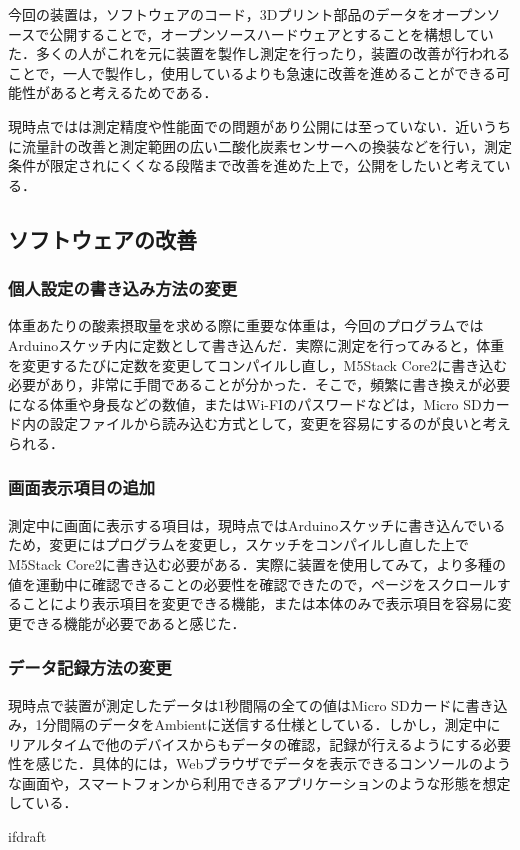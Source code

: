 今回の装置は，ソフトウェアのコード，3Dプリント部品のデータをオープンソースで公開することで，オープンソースハードウェアとすることを構想していた．多くの人がこれを元に装置を製作し測定を行ったり，装置の改善が行われることで，一人で製作し，使用しているよりも急速に改善を進めることができる可能性があると考えるためである．

現時点ではは測定精度や性能面での問題があり公開には至っていない．近いうちに流量計の改善と測定範囲の広い二酸化炭素センサーへの換装などを行い，測定条件が限定されにくくなる段階まで改善を進めた上で，公開をしたいと考えている．

\subsection{ソフトウェアの改善}

\subsubsection{個人設定の書き込み方法の変更}

体重あたりの酸素摂取量を求める際に重要な体重は，今回のプログラムではArduinoスケッチ内に定数として書き込んだ．実際に測定を行ってみると，体重を変更するたびに定数を変更してコンパイルし直し，M5Stack Core2に書き込む必要があり，非常に手間であることが分かった．そこで，頻繁に書き換えが必要になる体重や身長などの数値，またはWi-FIのパスワードなどは，Micro SDカード内の設定ファイルから読み込む方式として，変更を容易にするのが良いと考えられる．

\subsubsection{画面表示項目の追加}

測定中に画面に表示する項目は，現時点ではArduinoスケッチに書き込んでいるため，変更にはプログラムを変更し，スケッチをコンパイルし直した上でM5Stack Core2に書き込む必要がある．実際に装置を使用してみて，より多種の値を運動中に確認できることの必要性を確認できたので，ページをスクロールすることにより表示項目を変更できる機能，または本体のみで表示項目を容易に変更できる機能が必要であると感じた．

\subsubsection{データ記録方法の変更}

現時点で装置が測定したデータは1秒間隔の全ての値はMicro SDカードに書き込み，1分間隔のデータをAmbientに送信する仕様としている．しかし，測定中にリアルタイムで他のデバイスからもデータの確認，記録が行えるようにする必要性を感じた．具体的には，Webブラウザでデータを表示できるコンソールのような画面や，スマートフォンから利用できるアプリケーションのような形態を想定している．

\expandafter\ifx\csname ifdraft\endcsname\relax
  
\fi
